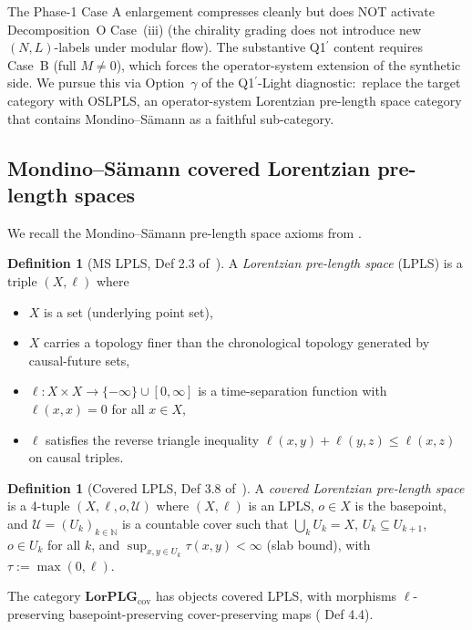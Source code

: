 \documentclass[11pt,a4paper]{article}
\theoremstyle{plain}
\theoremstyle{definition}
\newtheorem{definition}[theorem]{Definition}
\newcommand{\Ucal}{\mathcal{U}}
\newcommand{\N}{\mathbb{N}}
\newcommand{\LorPLG}{\mathbf{LorPLG}_{\mathrm{cov}}}
\begin{document}
The Phase-1 Case A enlargement compresses cleanly but does NOT
activate Decomposition~O Case~(iii) (the chirality grading does not
introduce new $(N,L)$-labels under modular flow). The substantive
Q1$^{\prime}$ content requires Case~B (full $M\ne 0$), which forces
the operator-system extension of the synthetic side. We pursue this
via Option~$\gamma$ of the Q1$^{\prime}$-Light diagnostic:\ replace
the target category with OSLPLS, an operator-system Lorentzian
pre-length space category that contains Mondino--S\"amann as a
faithful sub-category.

\subsection{Mondino--S\"amann covered Lorentzian pre-length spaces}
\label{sec:ms_recap}

We recall the Mondino--S\"amann pre-length space axioms from
\cite{mondino_samann2025_pointed}.

\begin{definition}[MS LPLS, Def 2.3 of~\cite{mondino_samann2025_pointed}]
\label{def:ms_lpls}
A \emph{Lorentzian pre-length space} (LPLS) is a triple $(X,\ell)$ where
\begin{itemize}
\item[(a)] $X$ is a set (underlying point set),
\item[(b)] $X$ carries a topology finer than the chronological
topology generated by causal-future sets,
\item[(c)] $\ell:X\times X\to\{-\infty\}\cup[0,\infty]$ is a
time-separation function with
$\ell(x,x)=0$ for all $x\in X$,
\item[(d)] $\ell$ satisfies the reverse triangle inequality
$\ell(x,y)+\ell(y,z)\le\ell(x,z)$ on causal triples.
\end{itemize}
\end{definition}

\begin{definition}[Covered LPLS, Def 3.8 of~\cite{mondino_samann2025_pointed}]
\label{def:ms_covered_lpls}
A \emph{covered Lorentzian pre-length space} is a 4-tuple
$(X,\ell,o,\Ucal)$ where $(X,\ell)$ is an LPLS, $o\in X$ is the
basepoint, and $\Ucal=(U_{k})_{k\in\N}$ is a countable cover such
that $\bigcup_{k}U_{k}=X$, $U_{k}\subseteq U_{k+1}$, $o\in U_{k}$ for
all $k$, and $\sup_{x,y\in U_{k}}\tau(x,y)<\infty$ (slab bound), with
$\tau:=\max(0,\ell)$.
\end{definition}

The category $\LorPLG$ has objects covered LPLS, with morphisms
$\ell$-preserving basepoint-preserving cover-preserving maps
(\cite{mondino_samann2025_pointed} Def 4.4).
\end{document}
